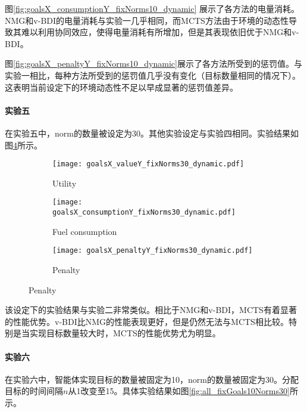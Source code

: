 图\ref{fig:goalsX_consumptionY_fixNorms10_dynamic} 展示了各方法的电量消耗。NMG和v-BDI的电量消耗与实验一几乎相同，而MCTS方法由于环境的动态性导致其难以利用协同效应，使得电量消耗有所增加，但是其表现依旧优于NMG和v-BDI。

图\ref{fig:goalsX_penaltyY_fixNorms10_dynamic}展示了各方法所受到的惩罚值。与实验一相比，每种方法所受到的惩罚值几乎没有变化（目标数量相同的情况下）。这表明当前设定下的环境动态性不足以早成显著的惩罚值差异。

\vspace{3cm}

\paragraph{实验五}
在实验五中，norm的数量被设定为30。其他实验设定与实验四相同。实验结果如图\ref{fig:all_fixNorms30_dynamic}所示。
\begin{figure}
\centering
\begin{subfigure}{.47\textwidth}
  \centering
  \texttt{[image: goalsX\_valueY\_fixNorms30\_dynamic.pdf]}
  \captionsetup{justification=centering}
  \caption{Utility}
  \label{fig:goalsX_valueY_fixNorms30_dynamic}
\end{subfigure}

\begin{subfigure}{.47\textwidth}
  \centering
  \texttt{[image: goalsX\_consumptionY\_fixNorms30\_dynamic.pdf]}
  \captionsetup{justification=centering}
  \caption{Fuel consumption}
  \label{fig:goalsX_consumptionY_fixNorms30_dynamic}
\end{subfigure}
\begin{subfigure}{.47\textwidth}
  \centering
  \texttt{[image: goalsX\_penaltyY\_fixNorms30\_dynamic.pdf]}
  \captionsetup{justification=centering}
  \caption{Penalty}
  \label{fig:goalsX_penaltyY_fixNorms30_dynamic}
\end{subfigure}
\captionsetup{justification=centering}
\label{fig:all_fixNorms30_dynamic}
\end{figure}

该设定下的实验结果与实验二非常类似。相比于NMG和v-BDI，MCTS有着显著的性能优势。v-BDI比NMG的性能表现更好，但是仍然无法与MCTS相比较。特别是当实现目标数量较大时，MCTS的性能优势尤为明显。

\paragraph{实验六}
在实验六中，智能体实现目标的数量被固定为10，norm的数量被固定为30。分配目标的时间间隔$n$从1改变至15。具体实验结果如图\ref{fig:all_fixGoals10Norms30}所示。

